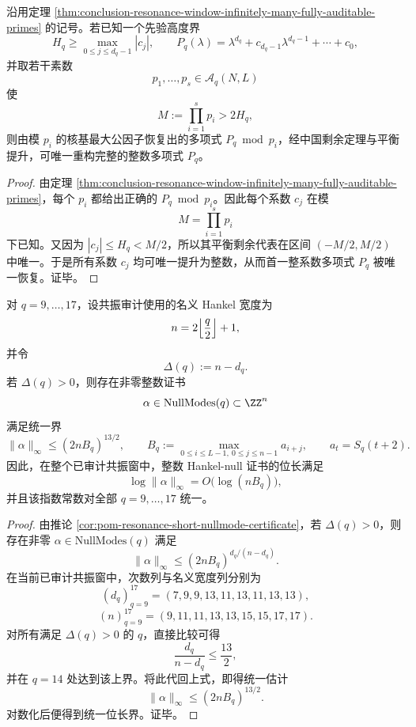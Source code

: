 \begin{theorem}\label{thm:conclusion-resonance-window-finite-prime-sampling-exact-recovery}
沿用定理 \ref{thm:conclusion-resonance-window-infinitely-many-fully-auditable-primes} 的记号。若已知一个先验高度界
\[
H_q\ge \max_{0\le j\le d_q-1}|c_j|,
\qquad
P_q(\lambda)=\lambda^{d_q}+c_{d_q-1}\lambda^{d_q-1}+\cdots+c_0,
\]
并取若干素数
\[
p_1,\dots,p_s\in \mathcal A_q(N,L)
\]
使
\[
M:=\prod_{i=1}^{s}p_i>2H_q,
\]
则由模 \(p_i\) 的核基最大公因子恢复出的多项式 \(P_q\bmod p_i\)，经中国剩余定理与平衡提升，可唯一重构完整的整数多项式 \(P_q\)。
\end{theorem}
\begin{proof}
由定理 \ref{thm:conclusion-resonance-window-infinitely-many-fully-auditable-primes}，每个 \(p_i\) 都给出正确的 \(P_q\bmod p_i\)。因此每个系数 \(c_j\) 在模
\[
M=\prod_{i=1}^{s}p_i
\]
下已知。又因为 \(|c_j|\le H_q<M/2\)，所以其平衡剩余代表在区间 \((-M/2,M/2)\) 中唯一。于是所有系数 \(c_j\) 均可唯一提升为整数，从而首一整系数多项式 \(P_q\) 被唯一恢复。证毕。
\end{proof}

\begin{theorem}\label{thm:conclusion-resonance-window-uniform-short-nullmode-certificates}
对 \(q=9,\dots,17\)，设共振审计使用的名义 Hankel 宽度为
\[
n=2\Bigl\lfloor\frac q2\Bigr\rfloor+1,
\]
并令
\[
\Delta(q):=n-d_q.
\]
若 \(\Delta(q)>0\)，则存在非零整数证书
\[
\alpha\in \mathrm{NullModes}(q)\subset \ZZ^n
\]
满足统一界
\[
\|\alpha\|_\infty\le (2nB_q)^{13/2},
\qquad
B_q:=\max_{0\le i\le L-1,\ 0\le j\le n-1}a_{i+j},
\qquad
a_t=S_q(t+2).
\]
因此，在整个已审计共振窗中，整数 Hankel-null 证书的位长满足
\[
\log \|\alpha\|_\infty = O\!\bigl(\log(nB_q)\bigr),
\]
并且该指数常数对全部 \(q=9,\dots,17\) 统一。
\end{theorem}
\begin{proof}
由推论 \ref{cor:pom-resonance-short-nullmode-certificate}，若 \(\Delta(q)>0\)，则存在非零
\(
\alpha\in\mathrm{NullModes}(q)
\)
满足
\[
\|\alpha\|_\infty\le (2nB_q)^{d_q/(n-d_q)}.
\]
在当前已审计共振窗中，次数列与名义宽度列分别为
\[
(d_q)_{q=9}^{17}=(7,9,9,13,11,13,11,13,13),
\]
\[
(n)_{q=9}^{17}=(9,11,11,13,13,15,15,17,17).
\]
对所有满足 \(\Delta(q)>0\) 的 \(q\)，直接比较可得
\[
\frac{d_q}{n-d_q}\le \frac{13}{2},
\]
并在 \(q=14\) 处达到该上界。将此代回上式，即得统一估计
\[
\|\alpha\|_\infty\le (2nB_q)^{13/2}.
\]
对数化后便得到统一位长界。证毕。
\end{proof}

